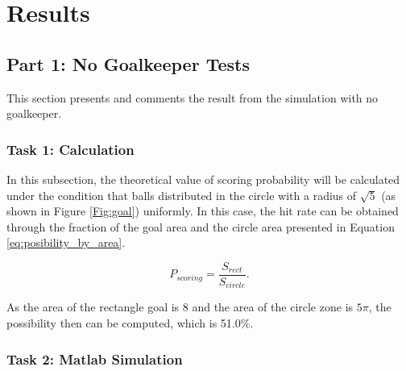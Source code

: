 \documentclass[11pt, a4paper]{article}
\begin{document}
%


\section{Results}

\subsection{Part 1: No Goalkeeper Tests}

This section presents and comments the result from the simulation with no goalkeeper.

\subsubsection{Task 1: Calculation}

In this subsection, the theoretical value of scoring probability will be calculated under the condition that balls distributed in the circle with a radius of $\sqrt{5}$ (as shown in Figure \ref{Fig:goal}) uniformly. In this case, the hit rate can be obtained through the fraction of the goal area and the circle area presented in Equation \ref{eq:posibility_by_area}.

\begin{equation}
P_{scoring} = \frac{S_{rect}}{S_{circle}}.
\label{eq:posibility_by_area}
\end{equation}

As the area of the rectangle goal is $8$ and the area of the circle zone is $5\pi$, the possibility then can be computed, which is 51.0\%.


\subsubsection{Task 2: Matlab Simulation}
\end{document}
